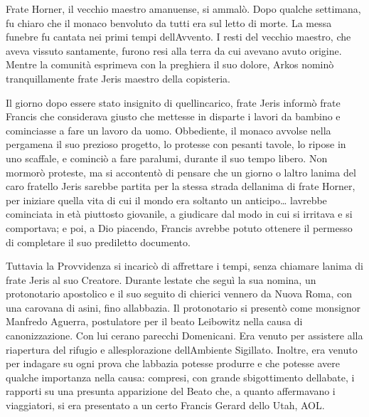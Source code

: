 Frate Horner, il vecchio maestro amanuense, si ammalò. Dopo qualche
settimana, fu chiaro che il monaco benvoluto da tutti era sul letto di
morte. La messa funebre fu cantata nei primi tempi
dell\textquotesingle Avvento. I resti del vecchio maestro, che aveva
vissuto santamente, furono resi alla terra da cui avevano avuto origine.
Mentre la comunità esprimeva con la preghiera il suo dolore, Arkos
nominò tranquillamente frate Jeris maestro della copisteria.

Il giorno dopo essere stato insignito di quell\textquotesingle incarico,
frate Jeris informò frate Francis che considerava giusto che mettesse in
disparte i lavori da bambino e cominciasse a fare un lavoro da uomo.
Obbediente, il monaco avvolse nella pergamena il suo prezioso progetto,
lo protesse con pesanti tavole, lo ripose in uno scaffale, e cominciò a
fare paralumi, durante il suo tempo libero. Non mormorò proteste, ma si
accontentò di pensare che un giorno o l\textquotesingle altro
l\textquotesingle anima del caro fratello Jeris sarebbe partita per la
stessa strada dell\textquotesingle anima di frate Horner, per iniziare
quella vita di cui il mondo era soltanto un anticipo\ldots{}
l\textquotesingle avrebbe cominciata in età piuttosto giovanile, a
giudicare dal modo in cui si irritava e si comportava; e poi, a Dio
piacendo, Francis avrebbe potuto ottenere il permesso di completare il
suo prediletto documento.

Tuttavia la Provvidenza si incaricò di affrettare i tempi, senza
chiamare l\textquotesingle anima di frate Jeris al suo Creatore. Durante
l\textquotesingle estate che seguì la sua nomina, un protonotario
apostolico e il suo seguito di chierici vennero da Nuova Roma, con una
carovana di asini, fino all\textquotesingle abbazia. Il protonotario si
presentò come monsignor Manfredo Aguerra, postulatore per il beato
Leibowitz nella causa di canonizzazione. Con lui c\textquotesingle erano
parecchi Domenicani. Era venuto per assistere alla riapertura del
rifugio e all\textquotesingle esplorazione dell\textquotesingle Ambiente
Sigillato. Inoltre, era venuto per indagare su ogni prova che
l\textquotesingle abbazia potesse produrre e che potesse avere qualche
importanza nella causa: compresi, con grande sbigottimento
dell\textquotesingle abate, i rapporti su una presunta apparizione del
Beato che, a quanto affermavano i viaggiatori, si era presentato a un
certo Francis Gerard dello Utah, AOL.

